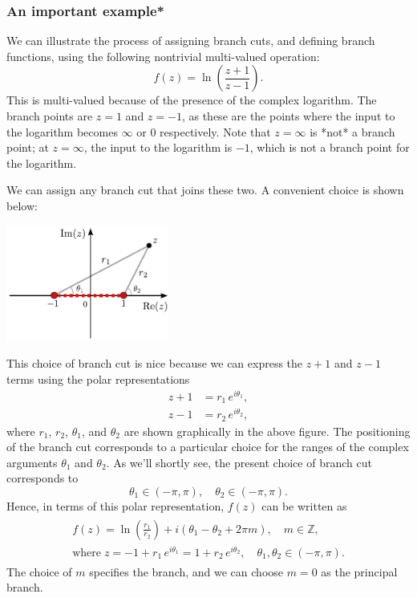 \documentclass[10pt,a4paper]{article}
\begin{document}
\subsubsection{An important example*}
\label{an-important-example}

We can illustrate the process of assigning branch cuts, and defining
branch functions, using the following nontrivial multi-valued
operation:
\begin{equation}
f(z) = \ln\left(\frac{z+1}{z-1}\right).
\end{equation}
This is multi-valued because of the presence of the complex
logarithm. The branch points are $z = 1$ and $z = -1$, as these are
the points where the input to the logarithm becomes $\infty$ or $0$
respectively. Note that $z = \infty$ is *not* a branch point; at $z =
\infty$, the input to the logarithm is $-1$, which is not a branch
point for the logarithm.

We can assign any branch cut that joins these two. A convenient choice
is shown below:

\begin{center}
  \includegraphics[width=0.4\textwidth]{branch_cut_example}
\end{center}

\noindent
This choice of branch cut is nice because we can express the $z+1$ and
$z - 1$ terms using the polar representations
\begin{align}
  z + 1 &= r_1\,e^{i\theta_1}, \\
  z - 1 &= r_2\, e^{i\theta_2},
\end{align}
where $r_1$, $r_2$, $\theta_1$, and $\theta_2$ are shown
graphically in the above figure. The positioning of the branch cut
corresponds to a particular choice for the ranges of the complex
arguments $\theta_1$ and $\theta_2$. As we'll shortly see, the
present choice of branch cut corresponds to
\begin{equation}
\theta_1 \in (-\pi,\pi), \quad \theta_2 \in (-\pi,\pi).
\end{equation}
Hence, in terms of this polar representation, $f(z)$ can be written as
\begin{align}
  \begin{aligned}
    f(z) = \ln\left(\frac{r_1}{r_2}\right) + i(\theta_1 - \theta_2 + 2\pi m), \quad m\in\mathbb{Z}, \\
    \mathrm{where}\; z = -1 + r_1\,e^{i\theta_1} = 1 + r_2\,e^{i\theta_2},\quad\theta_1, \theta_2 \in (-\pi,\pi).
  \end{aligned}
\end{align}
The choice of $m$ specifies the branch, and we can choose $m = 0$ as
the principal branch.
\end{document}
